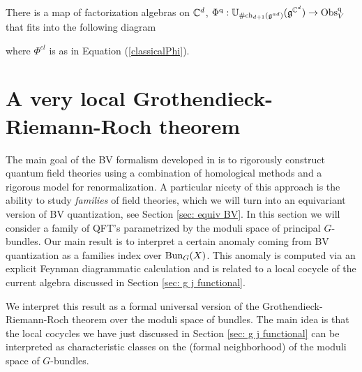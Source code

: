 \documentclass[10pt]{amsart}
\begin{document}
\subsubsection{}

\begin{cor}
There is a map of factorization algebras on $\mathbb C^d$, $\Phi^{\rm q} : \mathbb U_{\# {\rm ch}_{d+1}(\mathfrak g^{ad})}(\mathfrak g^{\mathbb C^d}) \to {\rm Obs}^{\rm q}_V$ 
that fits into the following diagram 
\ben
{}
 \een
 where $\Phi^{cl}$ is as in Equation (\ref{classicalPhi}). 
 \end{cor}



\appendix

\section{A very local Grothendieck-Riemann-Roch theorem}

The main goal of the BV formalism developed in \cite{CostelloRenormalization} is to rigorously construct quantum field theories using a combination of homological methods and a rigorous model for renormalization. 
A particular nicety of this approach is the ability to study {\em families} of field theories, which we will turn into an equivariant version of BV quantization, see Section \ref{sec: equiv BV}. 
In this section we will consider a family of QFT's parametrized by the moduli space of principal $G$-bundles. 
Our main result is to interpret a certain anomaly coming from BV quantization as a families index over ${\rm Bun}_G(X)$. 
This anomaly is computed via an explicit Feynman diagrammatic calculation and is related to a local cocycle of the current algebra discussed in Section \ref{sec: g j functional}.
 
We interpret this result as a formal universal version of the Grothendieck-Riemann-Roch theorem over the moduli space of bundles. 
The main idea is that the local cocycles we have just discussed in Section \ref{sec: g j functional} can be interpreted as characteristic classes on the (formal neighborhood) of the moduli space of $G$-bundles.
\end{document}
